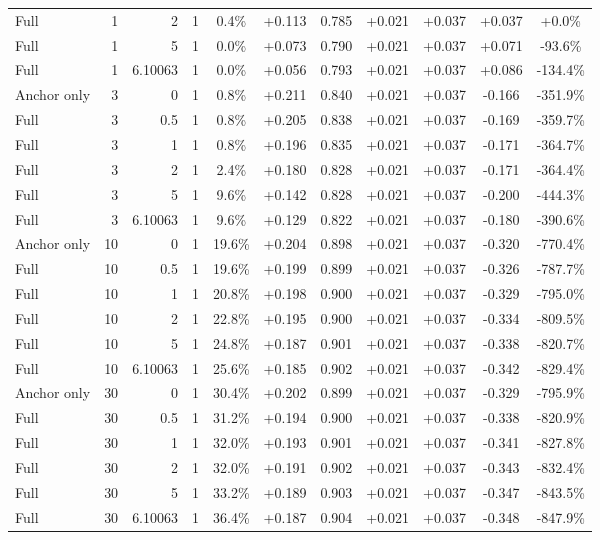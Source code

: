 \begin{table}[htbp]
\begin{tabular}{lrrrccccccc}
Full & 1 & 2 & 1 & 0.4\% & +0.113 & 0.785 & +0.021 & +0.037 & +0.037 & +0.0\% \\
Full & 1 & 5 & 1 & 0.0\% & +0.073 & 0.790 & +0.021 & +0.037 & +0.071 & -93.6\% \\
Full & 1 & 6.10063 & 1 & 0.0\% & +0.056 & 0.793 & +0.021 & +0.037 & +0.086 & -134.4\% \\
Anchor only & 3 & 0 & 1 & 0.8\% & +0.211 & 0.840 & +0.021 & +0.037 & -0.166 & -351.9\% \\
Full & 3 & 0.5 & 1 & 0.8\% & +0.205 & 0.838 & +0.021 & +0.037 & -0.169 & -359.7\% \\
Full & 3 & 1 & 1 & 0.8\% & +0.196 & 0.835 & +0.021 & +0.037 & -0.171 & -364.7\% \\
Full & 3 & 2 & 1 & 2.4\% & +0.180 & 0.828 & +0.021 & +0.037 & -0.171 & -364.4\% \\
Full & 3 & 5 & 1 & 9.6\% & +0.142 & 0.828 & +0.021 & +0.037 & -0.200 & -444.3\% \\
Full & 3 & 6.10063 & 1 & 9.6\% & +0.129 & 0.822 & +0.021 & +0.037 & -0.180 & -390.6\% \\
Anchor only & 10 & 0 & 1 & 19.6\% & +0.204 & 0.898 & +0.021 & +0.037 & -0.320 & -770.4\% \\
Full & 10 & 0.5 & 1 & 19.6\% & +0.199 & 0.899 & +0.021 & +0.037 & -0.326 & -787.7\% \\
Full & 10 & 1 & 1 & 20.8\% & +0.198 & 0.900 & +0.021 & +0.037 & -0.329 & -795.0\% \\
Full & 10 & 2 & 1 & 22.8\% & +0.195 & 0.900 & +0.021 & +0.037 & -0.334 & -809.5\% \\
Full & 10 & 5 & 1 & 24.8\% & +0.187 & 0.901 & +0.021 & +0.037 & -0.338 & -820.7\% \\
Full & 10 & 6.10063 & 1 & 25.6\% & +0.185 & 0.902 & +0.021 & +0.037 & -0.342 & -829.4\% \\
Anchor only & 30 & 0 & 1 & 30.4\% & +0.202 & 0.899 & +0.021 & +0.037 & -0.329 & -795.9\% \\
Full & 30 & 0.5 & 1 & 31.2\% & +0.194 & 0.900 & +0.021 & +0.037 & -0.338 & -820.9\% \\
Full & 30 & 1 & 1 & 32.0\% & +0.193 & 0.901 & +0.021 & +0.037 & -0.341 & -827.8\% \\
Full & 30 & 2 & 1 & 32.0\% & +0.191 & 0.902 & +0.021 & +0.037 & -0.343 & -832.4\% \\
Full & 30 & 5 & 1 & 33.2\% & +0.189 & 0.903 & +0.021 & +0.037 & -0.347 & -843.5\% \\
Full & 30 & 6.10063 & 1 & 36.4\% & +0.187 & 0.904 & +0.021 & +0.037 & -0.348 & -847.9\% \\

\end{tabular}
\end{table}
